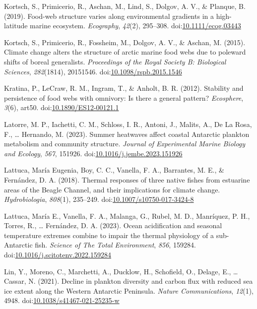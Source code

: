 \documentclass[
]{article}
\newlength{\cslhangindent}
\newenvironment{CSLReferences}[2] %
 {\begin{list}{}{%
  \setlength{\itemindent}{0pt}
  \setlength{\leftmargin}{0pt}
  \setlength{\parsep}{0pt}
  \ifodd #1
   \setlength{\leftmargin}{\cslhangindent}
   \setlength{\itemindent}{-1\cslhangindent}
  \fi
  \setlength{\itemsep}{#2\baselineskip}}}
 {\end{list}}
\begin{document}
\begin{CSLReferences}{1}{0}
Kortsch, S., Primicerio, R., Aschan, M., Lind, S., Dolgov, A. V., \&
Planque, B. (2019). Food-web structure varies along environmental
gradients in a high-latitude marine ecosystem. \emph{Ecography},
\emph{42}(2), 295--308.
doi:\href{https://doi.org/10.1111/ecog.03443}{10.1111/ecog.03443}

Kortsch, S., Primicerio, R., Fossheim, M., Dolgov, A. V., \& Aschan, M.
(2015). Climate change alters the structure of arctic marine food webs
due to poleward shifts of boreal generalists. \emph{Proceedings of the
Royal Society B: Biological Sciences}, \emph{282}(1814), 20151546.
doi:\href{https://doi.org/10.1098/rspb.2015.1546}{10.1098/rspb.2015.1546}

Kratina, P., LeCraw, R. M., Ingram, T., \& Anholt, B. R. (2012).
Stability and persistence of food webs with omnivory: {Is} there a
general pattern? \emph{Ecosphere}, \emph{3}(6), art50.
doi:\href{https://doi.org/10.1890/ES12-00121.1}{10.1890/ES12-00121.1}

Latorre, M. P., Iachetti, C. M., Schloss, I. R., Antoni, J., Malits, A.,
De La Rosa, F., \ldots{} Hernando, M. (2023). Summer heatwaves affect
coastal {Antarctic} plankton metabolism and community structure.
\emph{Journal of Experimental Marine Biology and Ecology}, \emph{567},
151926.
doi:\href{https://doi.org/10.1016/j.jembe.2023.151926}{10.1016/j.jembe.2023.151926}

Lattuca, María Eugenia, Boy, C. C., Vanella, F. A., Barrantes, M. E., \&
Fernández, D. A. (2018). Thermal responses of three native fishes from
estuarine areas of the {Beagle Channel}, and their implications for
climate change. \emph{Hydrobiologia}, \emph{808}(1), 235--249.
doi:\href{https://doi.org/10.1007/s10750-017-3424-8}{10.1007/s10750-017-3424-8}

Lattuca, María E., Vanella, F. A., Malanga, G., Rubel, M. D., Manríquez,
P. H., Torres, R., \ldots{} Fernández, D. A. (2023). Ocean acidification
and seasonal temperature extremes combine to impair the thermal
physiology of a sub-{Antarctic} fish. \emph{Science of The Total
Environment}, \emph{856}, 159284.
doi:\href{https://doi.org/10.1016/j.scitotenv.2022.159284}{10.1016/j.scitotenv.2022.159284}

Lin, Y., Moreno, C., Marchetti, A., Ducklow, H., Schofield, O., Delage,
E., \ldots{} Cassar, N. (2021). Decline in plankton diversity and carbon
flux with reduced sea ice extent along the {Western Antarctic
Peninsula}. \emph{Nature Communications}, \emph{12}(1), 4948.
doi:\href{https://doi.org/10.1038/s41467-021-25235-w}{10.1038/s41467-021-25235-w}


\end{CSLReferences}
\end{document}
